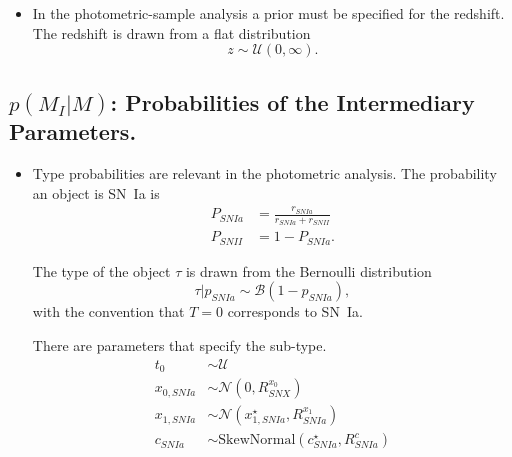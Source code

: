 \documentclass[preprint,3p]{elsarticle}
\begin{document}
\begin{itemize}
\item 
In the photometric-sample analysis a prior must be specified for the redshift.  The redshift is drawn from a flat distribution
\begin{equation}
z\sim \mathcal{U}(0,\infty).
\end{equation}
\end{itemize}

\subsection{$p(M_I|M)$: Probabilities of the Intermediary Parameters.}
\begin{itemize}
\item Type probabilities are relevant in the photometric analysis.
The probability an object is SN~Ia is
\begin{align}
P_{SNIa} &= \frac{r_{SNIa}}{r_{SNIa}+r_{SNII}} \nonumber \\
P_{SNII}&=1-P_{SNIa}.
\label{prob:eqn}
\end{align}

The type of the object $\tau$ is drawn from the Bernoulli distribution 
\begin{equation}
\tau | p_{SNIa} \sim \mathcal{B}(1-p_{SNIa}),
\end{equation}
with the convention that $T=0$ corresponds to SN~Ia.


There are parameters that specify the sub-type.
\begin{align}
t_0 & \sim \mathcal{U}\\
x_{0, SNIa} & \sim \mathcal{N}(0,R^{x_0}_{SNX})\\
x_{1,SNIa} & \sim \mathcal{N}(x_{1,SNIa}^\star,R^{x_1}_{SNIa})\\
c_{SNIa} & \sim \text{SkewNormal}(c^\star_{SNIa},R^{c}_{SNIa} )
\end{align}

\end{itemize}
\end{document}
